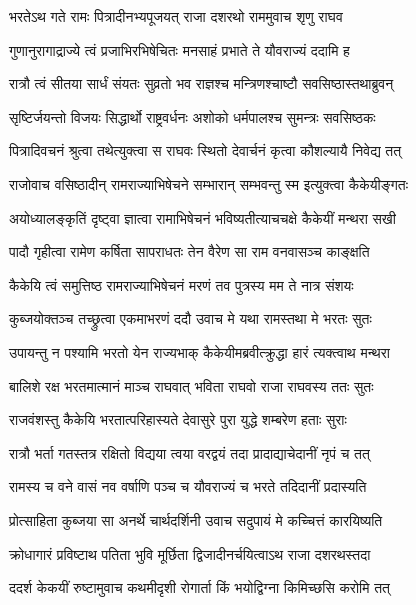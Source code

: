 

\twolineshloka
{भरतेऽथ गते रामः पित्रादीनभ्यपूजयत्}
{राजा दशरथो राममुवाच शृणु राघव} %

\twolineshloka
{गुणानुरागाद्राज्ये त्वं प्रजाभिरभिषेचितः}
{मनसाहं प्रभाते ते यौवराज्यं ददामि ह} %

\twolineshloka
{रात्रौ त्वं सीतया सार्धं संयतः सुव्रतो भव}
{राज्ञश्च मन्त्रिणश्चाष्टौ सवसिष्ठास्तथाब्रुवन्} %

\twolineshloka
{सृष्टिर्जयन्तो विजयः सिद्धार्थो राष्ट्रवर्धनः}
{अशोको धर्मपालश्च सुमन्त्रः सवसिष्ठकः} %

\twolineshloka
{पित्रादिवचनं श्रुत्वा तथेत्युक्त्वा स राघवः}
{स्थितो देवार्चनं कृत्वा कौशल्यायै निवेद्य तत्} %

\twolineshloka
{राजोवाच वसिष्ठादीन् रामराज्याभिषेचने}
{सम्भारान् सम्भवन्तु स्म इत्युक्त्वा कैकेयीङ्गतः} %

\twolineshloka
{अयोध्यालङ्कृतिं दृष्ट्वा ज्ञात्वा रामाभिषेचनं}
{भविष्यतीत्याचचक्षे कैकेयीं मन्थरा सखी} %

\twolineshloka
{पादौ गृहीत्वा रामेण कर्षिता सापराधतः}
{तेन वैरेण सा राम वनवासञ्च काङ्क्षति} %

\twolineshloka
{कैकेयि त्वं समुत्तिष्ठ रामराज्याभिषेचनं}
{मरणं तव पुत्रस्य मम ते नात्र संशयः} %

\twolineshloka
{कुब्जयोक्तञ्च तच्छ्रुत्वा एकमाभरणं ददौ}
{उवाच मे यथा रामस्तथा मे भरतः सुतः} %

\twolineshloka
{उपायन्तु न पश्यामि भरतो येन राज्यभाक्}
{कैकेयीमब्रवीत्क्रुद्धा हारं त्यक्त्वाथ मन्थरा} %

\twolineshloka
{बालिशे रक्ष भरतमात्मानं माञ्च राघवात्}
{भविता राघवो राजा राघवस्य ततः सुतः} %

\twolineshloka
{राजवंशस्तु कैकेयि भरतात्परिहास्यते}
{देवासुरे पुरा युद्धे शम्बरेण हताः सुराः} %

\twolineshloka
{रात्रौ भर्ता गतस्तत्र रक्षितो विद्यया त्वया}
{वरद्वयं तदा प्रादाद्याचेदानीं नृपं च तत्} %

\twolineshloka
{रामस्य च वने वासं नव वर्षाणि पञ्च च}
{यौवराज्यं च भरते तदिदानीं प्रदास्यति} %

\twolineshloka
{प्रोत्साहिता कुब्जया सा अनर्थे चार्थदर्शिनी}
{उवाच सदुपायं मे कच्चित्तं कारयिष्यति} %

\twolineshloka
{क्रोधागारं प्रविष्टाथ पतिता भुवि मूर्छिता}
{द्विजादीनर्चयित्वाऽथ राजा दशरथस्तदा} %

\twolineshloka
{ददर्श केकयीं रुष्टामुवाच कथमीदृशी}
{रोगार्ता किं भयोद्विग्ना किमिच्छसि करोमि तत्} %

